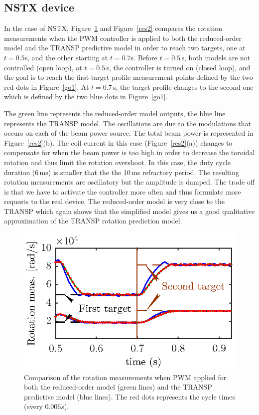 \documentclass[12pt,lot, lof]{puthesis}
\begin{document}
\subsection{NSTX device}

In the case of NSTX, Figure~\ref{res1} and Figure~\ref{res2} compares the rotation measurements when the PWM controller is applied to both the reduced-order model and the TRANSP predictive model in order to reach two targets, one at $t = 0.5$s, and the other starting at $t=0.7$s.
Before $t=0.5$\,s, both models are not controlled (open loop), at $t = 0.5$\,s, the controller is turned on (closed loop), and the goal is to reach the first target profile measurement points defined by the two red dots in Figure~\ref{go1}. At $t = 0.7$\,s, the  target profile changes to the second one which is defined by the two blue dots in Figure~\ref{go1}.

The green line represents the reduced-order model outputs, the blue line represents the TRANSP model. The oscillations are due to the modulations that occurs on each of the beam power source. The total beam power is represented in Figure~\ref{res2}(b). The coil current in this case (Figure~\ref{res2}(a)) changes to compensate for when the beam power is too high in order to decrease the toroidal rotation and thus limit the rotation overshoot.
In this case, the duty cycle duration (6\,ms) is smaller that the the 10\,ms refractory period.
The resulting rotation measurements are oscillatory but the amplitude is damped. The trade off is that we have to activate the controller more often and thus formulate more requests to the real device.
The reduced-order model is very close to the TRANSP which again shows that the simplified model gives us a good qualitative approximation of the TRANSP rotation prediction model.

\begin{figure}[htbp]
	\centering
	\includegraphics[width= 0.7\linewidth]{fig18}
	\caption{Comparison of the rotation measurements when PWM applied for both the reduced-order model (green lines) and the TRANSP predictive model (blue lines). The red dots represents the cycle times (every $0.006 s$).}
	\label{res1}
\end{figure}
\end{document}
